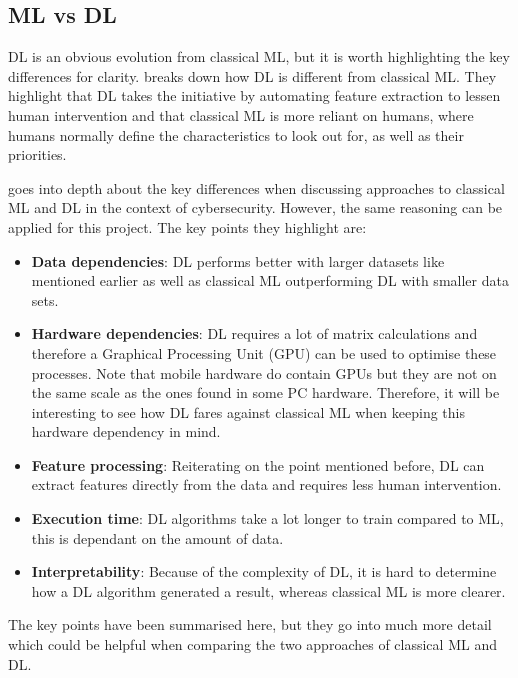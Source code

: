 \documentclass[12pt,a4paper]{report}
\begin{document}
\subsection{ML vs DL}
\label{subsec:mlvsdl}

DL is an obvious evolution from classical ML, but it is worth highlighting the key differences for clarity. 
\citet{kav2020} breaks down how DL is different 
from classical ML. They highlight that DL takes the initiative by automating feature extraction to lessen human intervention and 
that classical ML is more reliant on humans, where humans normally define the characteristics to look out for, as well as their 
priorities.

\par

\citet{8359287} goes into depth about the key differences when discussing approaches to classical ML and DL in the 
context of cybersecurity. However, the same reasoning can be applied for this project. The key points they highlight 
are:

\begin{itemize}
    \item \textbf{Data dependencies}: DL performs better with larger datasets like mentioned earlier as well as
    classical ML outperforming DL with smaller data sets.
    \item \textbf{Hardware dependencies}: DL requires a lot of matrix calculations and therefore a Graphical Processing 
    Unit (GPU) can be used to optimise these processes. Note that mobile hardware do contain GPUs but they are
    not on the same scale as the ones found in some PC hardware. Therefore, it will be interesting to see how DL 
    fares against classical ML when keeping this hardware dependency in mind.
    \item \textbf{Feature processing}: Reiterating on the point mentioned before, DL can extract features directly 
    from the data and requires less human intervention.
    \item \textbf{Execution time}: DL algorithms take a lot longer to train compared to ML, this is dependant on the amount of 
    data.
    \item \textbf{Interpretability}: Because of the complexity of DL, it is hard to determine how a DL algorithm generated a 
    result, whereas classical ML is more clearer.
\end{itemize}

The key points have been summarised here, but they go into much more detail which could be helpful when
comparing the two approaches of classical ML and DL.
\end{document}

